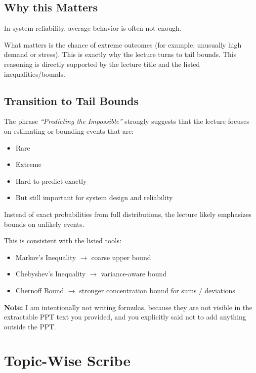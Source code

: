 \documentclass[11pt]{article}
\begin{document}
\subsection*{Why this Matters}

In system reliability, average behavior is often not enough.

What matters is the chance of extreme outcomes (for example, unusually high demand or stress). This is exactly why the lecture turns to tail bounds. This reasoning is directly supported by the lecture title and the listed inequalities/bounds.

\subsection{Transition to Tail Bounds}

The phrase \textit{``Predicting the Impossible''} strongly suggests that the lecture focuses on estimating or bounding events that are:

\begin{itemize}
    \item Rare
    \item Extreme
    \item Hard to predict exactly
    \item But still important for system design and reliability
\end{itemize}

Instead of exact probabilities from full distributions, the lecture likely emphasizes bounds on unlikely events.

This is consistent with the listed tools:

\begin{itemize}
    \item Markov's Inequality $\rightarrow$ coarse upper bound
    \item Chebyshev's Inequality $\rightarrow$ variance-aware bound
    \item Chernoff Bound $\rightarrow$ stronger concentration bound for sums / deviations
\end{itemize}

\textbf{Note:} I am intentionally not writing formulas, because they are not visible in the extractable PPT text you provided, and you explicitly said not to add anything outside the PPT.

\section{Topic-Wise Scribe}
\end{document}
